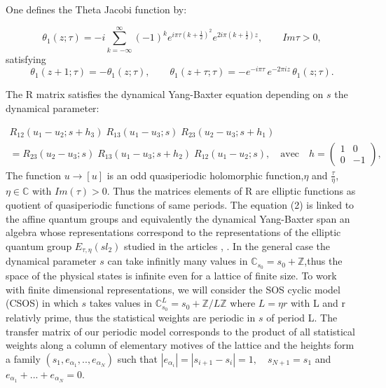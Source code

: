 \documentclass[12pt]{article}
\begin{document}
One defines the Theta Jacobi function by:

\begin{equation}\label{theta1}
  \theta_1(z;\tau)=-i\sum_{k=-\infty}^{\infty} (-1)^k e^{i\pi\tau (k+\frac12)^2} e^{2i\pi (k+\frac12)z},
  \qquad Im\tau>0,
\end{equation}
%
satisfying
%
\begin{equation}\label{periods}
   \theta_1(z+1;\tau)=-\theta_1(z;\tau), \qquad
   \theta_1(z+\tau;\tau)= -e^{-i\pi\tau}\, e^{-2\pi i z}\, \theta_1(z;\tau).
\end{equation}

The R matrix satisfies the dynamical Yang-Baxter equation depending on $s$ the dynamical parameter:


\begin{multline}\label{YB}
  R_{12}(u_1-u_2; s+h_3) \; R_{13}(u_1-u_3 ; s) \; R_{23}( u_2-u_3 ; s+h_1) \\
  =
  R_{23}(u_2-u_3; s) \; R_{13}(u_1-u_3 ; s+h_2) \; R_{12}( u_1-u_2 ; s) , \quad
  \text{avec} \quad
  h=\begin{pmatrix} 1 & 0 \\ 0 & -1 \end{pmatrix},
\end{multline}
The function $u \to [u]$ is an odd quasiperiodic holomorphic function,$\eta$ and $\frac{\tau}{\eta}$, $\eta \in \mathbb{C}$ with $Im(\tau)>0$. Thus the matrices elements of R are elliptic functions as quotient of quasiperiodic functions of same periods. 
The equation (2) is linked to the affine quantum groups and equivalently the dynamical Yang-Baxter span an algebra whose representations correspond to the representations of the elliptic quantum group $E_{\tau,\eta}(sl_2)$ studied in the articles \cite{FelV96b}, \cite{FelV96a}. %
In the general case the dynamical parameter $s$ can take infinitly many values in $\mathbb{C}_{s_0}=s_0 +\mathbb{Z}$,thus the space of the physical states is infinite even for a lattice of finite size. To work with finite dimensional representations, we will consider the SOS cyclic model (CSOS) in which  $s$ takes values in $\mathbb{C}^{L}_{s_0}=s_0 +\mathbb{Z}/L\mathbb{Z}$ where $L=\eta r$ with L and r relativly prime, thus the statistical weights are periodic in $s$ of period L.
The transfer matrix of our periodic model corresponds to the product of all statistical weights along a column of elementary motives of the lattice and the heights form a family $(s_1,e_{\alpha_{1}},..,e_{\alpha_{N}})$ such that $|e_{\alpha_{i}}|=|s_{i+1}-s_i|=1, \quad s_{N+1}=s_1 $ and $e_{\alpha_{1}}+...+e_{\alpha_{N}}=0$.
\end{document}
